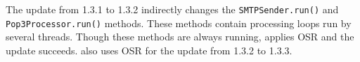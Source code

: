 The update from 1.3.1 to 1.3.2 indirectly changes the
\texttt{SMTP\-Sen\-d\-er.run()} and \texttt{Pop3\-Processor.run()} methods.  These
methods contain processing loops run by several threads.  Though these
methods are always running, \DSU{} applies OSR and the update succeeds.
\DSU{} also uses OSR for the update from 1.3.2 to 1.3.3.
